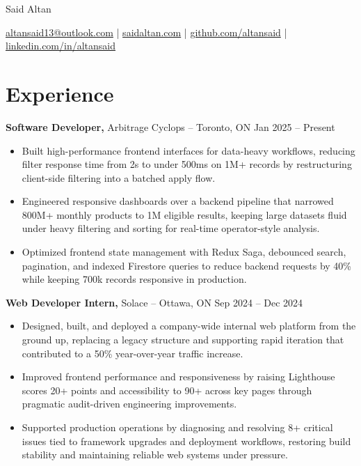 \documentclass[11pt]{article}       %
\begin{document}
\centerline{\Huge Said Altan}

\vspace{10pt}

\centerline{\href{mailto:altansaid13@outlook.com}{altansaid13@outlook.com} | \href{https://saidaltan.com}{saidaltan.com} | \href{https://github.com/altansaid}{github.com/altansaid} | \href{https://www.linkedin.com/in/altansaid}{linkedin.com/in/altansaid}}


\vspace{5pt}
\section*{Experience}
\textbf{Software Developer,} {Arbitrage Cyclops} -- Toronto, ON \hfill Jan 2025 -- Present \\
\vspace{-9pt}
\begin{itemize}
  \item Built high-performance frontend interfaces for data-heavy workflows, reducing filter response time from 2s to under 500ms on 1M+ records by restructuring client-side filtering into a batched apply flow.
  \item Engineered responsive dashboards over a backend pipeline that narrowed 800M+ monthly products to 1M eligible results, keeping large datasets fluid under heavy filtering and sorting for real-time operator-style analysis.
  \item Optimized frontend state management with Redux Saga, debounced search, pagination, and indexed Firestore queries to reduce backend requests by 40\% while keeping 700k records responsive in production.
\end{itemize}

\textbf{Web Developer Intern,} {Solace} -- Ottawa, ON \hfill Sep 2024 -- Dec 2024 \\
\vspace{-9pt}
\begin{itemize}
  \item Designed, built, and deployed a company-wide internal web platform from the ground up, replacing a legacy structure and supporting rapid iteration that contributed to a 50\% year-over-year traffic increase.
  \item Improved frontend performance and responsiveness by raising Lighthouse scores 20+ points and accessibility to 90+ across key pages through pragmatic audit-driven engineering improvements.
  \item Supported production operations by diagnosing and resolving 8+ critical issues tied to framework upgrades and deployment workflows, restoring build stability and maintaining reliable web systems under pressure.
\end{itemize}
\end{document}
